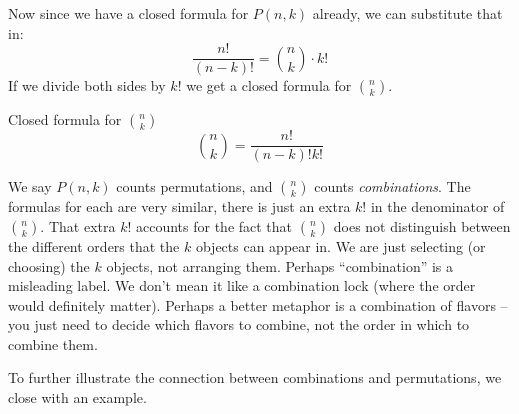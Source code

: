 \documentclass[12pt]{article}
\begin{document}
Now since we have a closed formula for $P(n,k)$ already, we can substitute that in:
\[\frac{n!}{(n-k)!} = {n \choose k} \cdot k!\]
If we divide both sides by $k!$ we get a closed formula for ${n \choose k}$.

\begin{defbox}{Closed formula for ${n \choose k}$}
  \[{n \choose k} = \frac{n!}{(n-k)!k!}\]
\end{defbox}

We say $P(n,k)$ counts permutations, and ${n \choose k}$ counts \emph{combinations}.  The formulas for each are very similar, there is just an extra $k!$ in the denominator of ${n \choose k}$.  That extra $k!$ accounts for the fact that ${n \choose k}$ does not distinguish between the different orders that the $k$ objects can appear in.  We are just selecting (or choosing) the $k$ objects, not arranging them.  Perhaps ``combination'' is a misleading label.  We don't mean it like a combination lock (where the order would definitely matter).  Perhaps a better metaphor is a combination of flavors -- you just need to decide which flavors to combine, not the order in which to combine them.

To further illustrate the connection between combinations and permutations, we close with an example.
\end{document}
